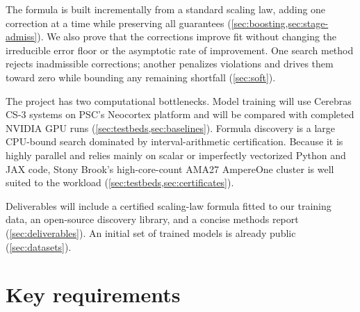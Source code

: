 \documentclass[11pt]{article}
\begin{document}
The formula is built incrementally from a standard scaling law, adding one correction at a time while preserving all guarantees (\cref{sec:boosting,sec:stage-admiss}). We also prove that the corrections improve fit without changing the irreducible error floor or the asymptotic rate of improvement. One search method rejects inadmissible corrections; another penalizes violations and drives them toward zero while bounding any remaining shortfall (\cref{sec:soft}).

The project has two computational bottlenecks. Model training will use Cerebras CS-3 systems on PSC's Neocortex platform and will be compared with completed NVIDIA GPU runs (\cref{sec:testbeds,sec:baselines}). Formula discovery is a large CPU-bound search dominated by interval-arithmetic certification. Because it is highly parallel and relies mainly on scalar or imperfectly vectorized Python and JAX code, Stony Brook's high-core-count AMA27 AmpereOne cluster is well suited to the workload (\cref{sec:testbeds,sec:certificates}).

Deliverables will include a certified scaling-law formula fitted to our training data, an open-source discovery library, and a concise methods report (\cref{sec:deliverables}). An initial set of trained models is already public (\cref{sec:datasets}).

\section{Key requirements}\label{sec:requirements}
\end{document}
